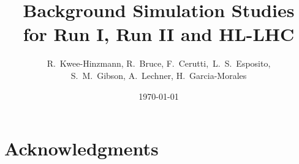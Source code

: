 \documentclass{cernatsreport}    %
\title{Background Simulation Studies \\
  for Run I, Run II and HL-LHC}
\author{R.~Kwee-Hinzmann, R.~Bruce, F.~Cerutti,~L.~S.~Esposito, \\S.~M.~Gibson, A.~Lechner, H.~Garcia-Morales}
\date{\today}
\begin{document}



\maketitle                 %

\tableofcontents
\newpage
\newpage










\section*{Acknowledgments}
%

\newpage
\clearpage
\appendix
\newpage
\clearpage
\newpage
\newpage
\newpage

\newpage

        
        
\end{document}
